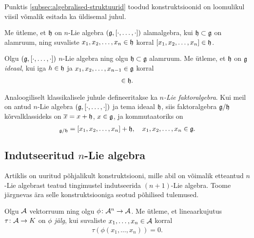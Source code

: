 Punktis \ref{subsec:algebralised-struktuurid} toodud konstruktsioonid
on loomulikul viisil võmalik esitada ka üldisemal juhul.

\begin{dfn}\label{def:n-lie-alamalgebra}
    Me ütleme, et $\mathfrak{h}$ on $n$-Lie algebra $(\mathfrak{g}, [\cdot, \dots, \cdot])$
    alamalgebra, kui $\mathfrak{h} \subset \mathfrak{g}$ on alamruum, ning suvaliste
    $x_1, x_2, \dots, x_n \in \mathfrak{h}$ korral $[x_1, x_2, \dots, x_n] \in \mathfrak{h}$.
\end{dfn}

\begin{dfn}\label{def:n-lie-algebra-ideaal}
    Olgu $(\mathfrak{g}, [\cdot, \dots, \cdot])$ $n$-Lie algebra ning olgu
    $\mathfrak{h} \subset \mathfrak{g}$ alamruum. Me ütleme, et $\mathfrak{h}$ on $\mathfrak{g}$ \emph{ideaal}, kui
    iga $h \in \mathfrak{h}$ ja $x_1, x_2, \dots, x_{n-1} \in \mathfrak{g}$ korral
    \begin{align*}
        [h, x_1, x_2, \dots, x_{n-1}] \in \h.
    \end{align*}
\end{dfn}

Analoogiliselt klassikalisele juhule defineeritakse ka
\emph{$n$-Lie faktoralgebra}.
Kui meil on antud $n$-Lie algebra $(\mathfrak{g}, [\cdot, \dots, \cdot])$ ja tema
ideaal $\mathfrak{h}$, siis faktoralgebra $\mathfrak{g}/\mathfrak{h}$ kõrvalklassideks on
$\overline{x} = x + \mathfrak{h}$, $x \in \mathfrak{g}$, ja kommutaatoriks on
\begin{align*}
    [x_1 + \h, x_2 + \h, \dots, x_n + \h]_{\g/\h} =
    [x_1, x_2, \dots, x_n] + \h,\quad
    x_1, x_2, \dots, x_n \in \g.
\end{align*}

\subsection{Indutseeritud \texorpdfstring{$n$}{n}-Lie algebra
  }\label{subsec:indutseeritud-n-lie-alg}

Artiklis \cite{AKMS:2014} on uuritud põhjalikult konstruktsiooni, mille
abil on võimalik etteantud $n$-Lie algebrast teatud tingimustel indutseerida
$(n+1)$-Lie algebra. Toome järgnevas ära selle konstruktsiooniga seotud
põhilised tulemused.

\begin{dfn}[Jälg]
    Olgu $\mathcal{A}$ vektorruum ning olgu $\phi \colon \mathcal{A}^n \to \mathcal{A}$. Me
    ütleme, et lineaarkujutus $\tau \colon \mathcal{A} \to K$ on
    \emph{$\phi$ jälg}, kui suvaliste $x_1, \dots, x_n \in \mathcal{A}$
    korral
    \begin{align*}
        \tau \left(
            \phi \left( x_1, \dots, x_n \right)
        \right) = 0.
    \end{align*}
\end{dfn}

